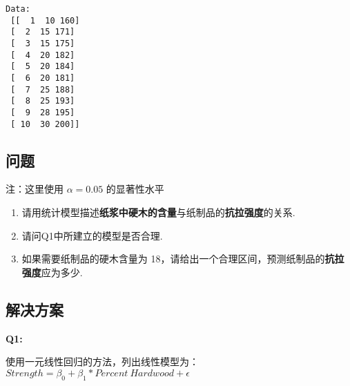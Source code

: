 \documentclass[11pt]{ctexart}
\providecommand{\tightlist}{%
      \setlength{\itemsep}{0pt}\setlength{\parskip}{0pt}}
\begin{document}
    \begin{Verbatim}[commandchars=\\\{\}]
Data:
 [[  1  10 160]
 [  2  15 171]
 [  3  15 175]
 [  4  20 182]
 [  5  20 184]
 [  6  20 181]
 [  7  25 188]
 [  8  25 193]
 [  9  28 195]
 [ 10  30 200]]
    \end{Verbatim}

    \hypertarget{ux95eeux9898}{%
\subsection{问题}\label{ux95eeux9898}}

注：这里使用 \(\alpha=0.05\) 的显著性水平

\begin{enumerate}
\def\labelenumi{\arabic{enumi}.}
\tightlist
\item
  请用统计模型描述\textbf{纸浆中硬木的含量}与纸制品的\textbf{抗拉强度}的关系.
\item
  请问Q1中所建立的模型是否合理.
\item
  如果需要纸制品的硬木含量为
  18，请给出一个合理区间，预测纸制品的\textbf{抗拉强度}应为多少.
\end{enumerate}

\hypertarget{ux89e3ux51b3ux65b9ux6848}{%
\subsection{解决方案}\label{ux89e3ux51b3ux65b9ux6848}}

    \textbf{Q1:}

使用一元线性回归的方法，列出线性模型为：\(Strength = \beta_0 + \beta_1*Percent\ Hardwood + \epsilon\)
\end{document}
